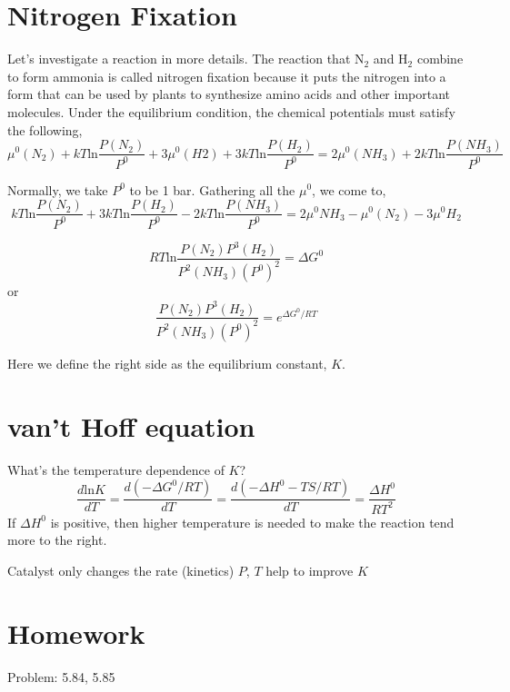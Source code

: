 \section{Nitrogen Fixation}
Let's investigate a reaction in more details. The reaction that N$_2$ and H$_2$ combine to form ammonia is called nitrogen fixation
because it puts the nitrogen into a form that can be used by plants to synthesize amino acids and other important molecules.
Under the equilibrium condition, the chemical potentials must satisfy the following,
\begin{equation}
\mu^0(N_2) + kT\text{ln}\frac{P(N_2)}{P^0} + 3\mu^0(H2) + 3kT\text{ln}\frac{P(H_2)}{P^0}  =  2\mu^0(NH_3) + 2kT\text{ln}\frac{P(NH_3)}{P^0}
\end{equation}

Normally, we take $P^0$ to be 1 bar. Gathering all the $\mu^0$, we come to,
\begin{equation}
kT\text{ln}\frac{P(N_2)}{P^0} + 3kT\text{ln}\frac{P(H_2)}{P^0} - 2kT\text{ln}\frac{P(NH_3)}{P^0} = 
2\mu^0{NH_3} - \mu^0(N_2) - 3\mu^0{H_2}
\end{equation}

\begin{equation}
RT\text{ln}\frac{P(N_2)P^3(H_2)}{P^2(NH_3)(P^0)^2} = \Delta{G^0}
\end{equation}
or
\begin{equation}
\frac{P(N_2)P^3(H_2)}{P^2(NH_3)(P^0)^2} = e^{\Delta{G^0}/RT}
\end{equation}

Here we define the right side as the equilibrium constant, $K$.

\section{van't Hoff equation}
What's the temperature dependence of $K$?
\begin{equation}
\frac{d\text{ln}K}{dT} = \frac{d(-\Delta{G^0}/RT)}{dT} =  \frac{d(-\Delta{H^0-TS}/RT)}{dT} = \frac{\Delta{H^0}}{RT^2}
\end{equation}
If $\Delta{H^0}$ is positive, then higher temperature is needed to make the reaction tend more to the right.

Catalyst only changes the rate (kinetics) 
$P$, $T$ help to improve $K$

\section{Homework}
Problem: 5.84, 5.85


